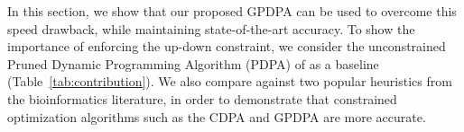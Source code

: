 \documentclass{article}
\begin{document}
In this section, we show that our proposed GPDPA can be used to
overcome this speed drawback, while maintaining state-of-the-art
accuracy. To show the importance of enforcing the up-down constraint,
we consider the unconstrained Pruned Dynamic Programming Algorithm
(PDPA) of \citet{pruned-dp} as a baseline
(Table~\ref{tab:contribution}). We also compare against two popular
heuristics from the bioinformatics literature, in order to demonstrate
that constrained optimization algorithms such as the CDPA and GPDPA
are more accurate.

\end{document}
